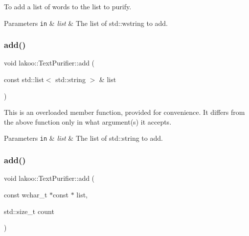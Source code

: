 To add a list of words to the list to purify. 


\begin{DoxyParams}[1]{Parameters}
\mbox{\tt in}  & {\em list} & The list of std\+::wstring to add. \\
\hline
\end{DoxyParams}
\mbox{\label{classlakoo_1_1_text_purifier_ab5329c055bac1d28a85e16c90bab12d9}} 
\subsubsection{\texorpdfstring{add()}{add()}\hspace{0.1cm}{\footnotesize\ttfamily [6/8]}}
{\footnotesize\ttfamily void lakoo\+::\+Text\+Purifier\+::add (\begin{DoxyParamCaption}\item[{const std\+::list$<$ std\+::string $>$ \&}]{list }\end{DoxyParamCaption})}

This is an overloaded member function, provided for convenience. It differs from the above function only in what argument(s) it accepts. 
\begin{DoxyParams}[1]{Parameters}
\mbox{\tt in}  & {\em list} & The list of std\+::string to add. \\
\hline
\end{DoxyParams}
\mbox{\label{classlakoo_1_1_text_purifier_a18c9fc28060bb7e75dfcd88a277a2cbb}} 
\subsubsection{\texorpdfstring{add()}{add()}\hspace{0.1cm}{\footnotesize\ttfamily [7/8]}}
{\footnotesize\ttfamily void lakoo\+::\+Text\+Purifier\+::add (\begin{DoxyParamCaption}\item[{const wchar\+\_\+t $\ast$const $\ast$}]{list,  }\item[{std\+::size\+\_\+t}]{count }\end{DoxyParamCaption})}

